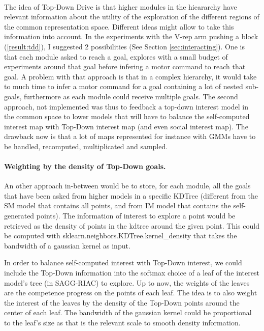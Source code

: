 \documentclass[12pt]{article}
\begin{document}
		\paragraph{}
		The idea of Top-Down Drive is that higher modules in the hieararchy have relevant information about the utility of the exploration of the different regions of the common representation space.
		Different ideas might allow to take this information into account.
		In the experiments with the V-rep arm pushing a block (\ref{result:tdd}), I suggested 2 possibilities (See Section \ref{sec:interacting}).
		One is that each module asked to reach a goal, explores with a small budget of experiments around that goal before infering a motor command to reach that goal.
		A problem with that approach is that in a complex hierarchy, it would take to much time to infer a motor command for a goal containing a lot of nested sub-goals, 
		furthermore as each module could receive multiple goals.
		The second approach, not implemented was thus to feedback a top-down interest model in the common space to lower models that will have to balance 
		the self-computed interest map with Top-Down interest map (and even social interest map).
		The drawback now is that a lot of maps represented for instance with GMMs have to be handled, recomputed, multiplicated and sampled.
		
		\paragraph{Weighting by the density of Top-Down goals.}
		An other approach in-between would be to store, for each module, all the goals that have been asked from higher models in a specific KDTree 
		(different from the SM model that contains all points, and from IM model that contains the self-generated points).
		The information of interest to explore a point would be retrieved as the density of points in the kdtree around the given point.
		This could be computed with sklearn.neighbors.KDTree.kernel\_density that takes the bandwidth of a gaussian kernel as input.
		
		In order to balance self-computed interest with Top-Down interest, we could include the Top-Down information into the softmax choice of a leaf of the interest model's tree (in SAGG-RIAC) to explore.
		Up to now, the weights of the leaves are the competence progress on the points of each leaf.
		The idea is to also weight the interest of the leaves by the density of the Top-Down points around the center of each leaf.
		The bandwidth of the gaussian kernel could be proportional to the leaf's size as that is the relevant scale to smooth density information.
		
\end{document}

